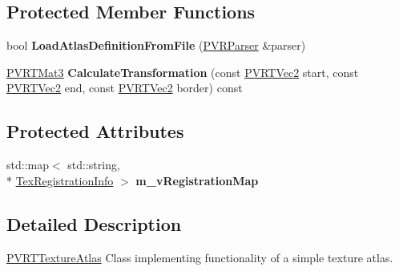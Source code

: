 \subsection*{Protected Member Functions}
\begin{DoxyCompactItemize}
\item 
\hypertarget{classpvrnavigation_1_1_p_v_r_t_texture_atlas_a935d68412f43001e4482d28ed6400466}{bool {\bfseries Load\+Atlas\+Definition\+From\+File} (\hyperlink{classpvrnavigation_1_1_p_v_r_parser}{P\+V\+R\+Parser} \&parser)}\label{classpvrnavigation_1_1_p_v_r_t_texture_atlas_a935d68412f43001e4482d28ed6400466}

\item 
\hypertarget{classpvrnavigation_1_1_p_v_r_t_texture_atlas_a797b50f950f45607d5baacafbd95d296}{\hyperlink{struct_p_v_r_t_mat3}{P\+V\+R\+T\+Mat3} {\bfseries Calculate\+Transformation} (const \hyperlink{struct_p_v_r_t_vec2}{P\+V\+R\+T\+Vec2} start, const \hyperlink{struct_p_v_r_t_vec2}{P\+V\+R\+T\+Vec2} end, const \hyperlink{struct_p_v_r_t_vec2}{P\+V\+R\+T\+Vec2} border) const }\label{classpvrnavigation_1_1_p_v_r_t_texture_atlas_a797b50f950f45607d5baacafbd95d296}

\end{DoxyCompactItemize}
\subsection*{Protected Attributes}
\begin{DoxyCompactItemize}
\item 
\hypertarget{classpvrnavigation_1_1_p_v_r_t_texture_atlas_a2494f011bc1e70c3d87cc59efda6809f}{std\+::map$<$ std\+::string, \\*
\hyperlink{structpvrnavigation_1_1_p_v_r_t_texture_atlas_1_1_tex_registration_info}{Tex\+Registration\+Info} $>$ {\bfseries m\+\_\+v\+Registration\+Map}}\label{classpvrnavigation_1_1_p_v_r_t_texture_atlas_a2494f011bc1e70c3d87cc59efda6809f}

\end{DoxyCompactItemize}


\subsection{Detailed Description}


  \hyperlink{classpvrnavigation_1_1_p_v_r_t_texture_atlas}{P\+V\+R\+T\+Texture\+Atlas}  Class implementing functionality of a simple texture atlas. 

